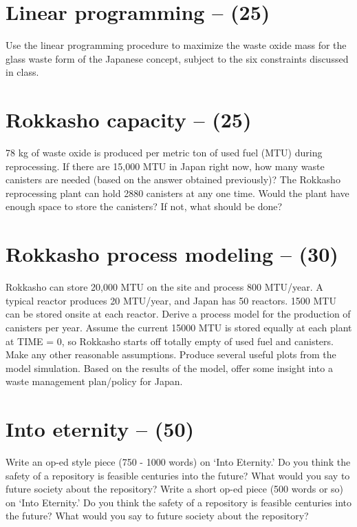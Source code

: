 \documentclass[11pt,a4paper]{article}
\begin{document}
\newpage

\section{Linear programming -- (25)}
Use the linear programming procedure to maximize the waste oxide mass for the glass waste form of the Japanese concept, subject to the six constraints discussed in class.





\newpage

\section{Rokkasho capacity -- (25)}
78 kg of waste oxide is produced per metric ton of used fuel (MTU) during reprocessing. If there are 15,000 MTU in Japan right now, how many waste canisters are needed (based on the answer obtained previously)? The Rokkasho reprocessing plant can hold 2880 canisters at any one time. Would the plant have enough space to store the canisters? If not, what should be done? 





\newpage

\section{Rokkasho process modeling -- (30)}
Rokkasho can store 20,000 MTU on the site and process 800 MTU/year. A typical reactor produces 20 MTU/year, and Japan has 50 reactors. 1500 MTU can be stored onsite at each reactor. Derive a process model for the production of canisters per year. Assume the current 15000 MTU is stored equally at each plant at TIME = 0, so Rokkasho starts off totally empty of used fuel and canisters. Make any other reasonable assumptions. Produce several useful plots from the model simulation. Based on the results of the model, offer some insight into a waste management plan/policy for Japan. 





\newpage

\section{Into eternity -- (50)}
Write an op-ed style piece (750 - 1000 words) on `Into Eternity.' Do you think the safety of a repository is feasible centuries into the future? What would you say to future society about the repository? Write a short op-ed piece (500 words or so) on ‘Into Eternity.’ Do you think the safety of a repository is feasible centuries into the future? What would you say to future society about the repository?
\end{document}
